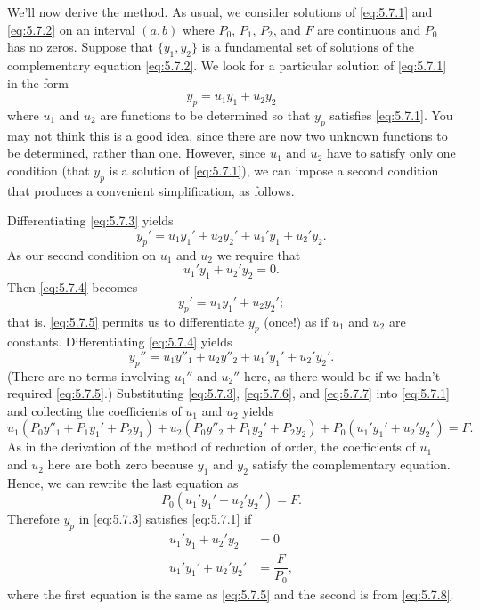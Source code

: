 We'll now derive the method. As usual, we consider solutions of
\eqref{eq:5.7.1} and \eqref{eq:5.7.2} on an interval $(a,b)$ where  $P_0$,
$P_1$, $P_2$, and $F$ are continuous and $P_0$ has no zeros. Suppose
that $\{y_1,y_2\}$ is a fundamental set of solutions of the
complementary equation \eqref{eq:5.7.2}. We look for
 a particular solution of \eqref{eq:5.7.1} in the form
\begin{equation} \label{eq:5.7.3}
y_p=u_1y_1+u_2y_2
\end{equation}
where $u_1$ and $u_2$ are functions to be determined so that $y_p$
satisfies \eqref{eq:5.7.1}. You may not think this is a good idea, since
there are now two unknown functions to be determined, rather than one.
However, since $u_1$ and $u_2$ have to satisfy only one condition
(that $y_p$ is a solution of \eqref{eq:5.7.1}), we can impose a second
condition that produces a convenient simplification, as follows.

 Differentiating \eqref{eq:5.7.3} yields
\begin{equation} \label{eq:5.7.4}
y_p'=u_1y_1'+u_2y_2'+u_1'y_1+u_2'y_2.
\end{equation}
As our second condition on $u_1$ and $u_2$
 we require that
\begin{equation} \label{eq:5.7.5}
u_1'y_1+u_2'y_2=0.
\end{equation}
 Then  \eqref{eq:5.7.4} becomes
\begin{equation}
y_p'=u_1y_1'+u_2y_2';     \label{eq:5.7.6}
\end{equation}
that is, \eqref{eq:5.7.5} permits us to differentiate $y_p$ (once!) as if
 $u_1$ and $u_2$ are constants. Differentiating
\eqref{eq:5.7.4} yields \begin{equation} \label{eq:5.7.7}
y_p''=u_1y''_1+u_2y''_2+u_1'y_1'+u_2'y_2'. \end{equation}
(There are no terms involving $u_1''$ and $u_2''$ here, as there would
be if we hadn't required \eqref{eq:5.7.5}.) Substituting \eqref{eq:5.7.3},
\eqref{eq:5.7.6}, and \eqref{eq:5.7.7} into \eqref{eq:5.7.1} and collecting the
coefficients of $u_1$ and $u_2$ yields
\[
u_1(P_0y''_1+P_1y_1'+P_2y_1)+u_2(P_0y''_2+P_1y_2'+P_2y_2)
+P_0(u_1'y_1'+u_2'y_2')=F.
\]
As in the derivation of the method of reduction of order, the
coefficients of $u_1$ and $u_2$ here are both zero because $y_1$ and
$y_2$ satisfy the complementary equation. Hence, we can rewrite the
last equation  as
\begin{equation}\label{eq:5.7.8}
  P_0(u_1'y_1'+u_2'y_2')=F.
\end{equation}
Therefore $y_p$ in \eqref{eq:5.7.3} satisfies \eqref{eq:5.7.1} if
\begin{equation} \label{eq:5.7.9}
\begin{aligned}
u_1'y_1+u_2'y_2 &= 0  \\
u_1'y_1'+u_2'y_2' &= \dfrac{F}{P_0},
\end{aligned}
\end{equation}
where the first equation is the same as \eqref{eq:5.7.5} and the second is
from \eqref{eq:5.7.8}.

